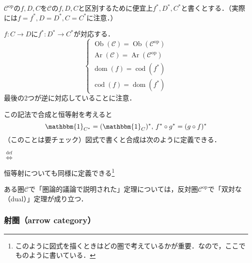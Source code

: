 \documentclass[dvipdfmx,a4j,10pt]{jsarticle}
\theoremstyle{mystyle1}
\theoremstyle{mystyle2}
\newcommand{\defLeftrightarrow}{\overset{\text{def}}{\iff}}
\DeclareMathOperator{\Ob}{Ob}
\DeclareMathOperator{\Ar}{Ar}
\DeclareMathOperator{\dom}{dom}
\DeclareMathOperator{\cod}{cod}
\begin{document}
$\mathcal{C}^{\mathrm{op}}$の$f,D,C$を$\mathcal{C}$の$f,D,C$と区別するために便宜上$f^*,D^*,C^*$と書くとする．（実際には$f=f^*,D=D^*,C=C^*$に注意．）

$f:C\to D$に$f^*:D^* \to C^*$が対応する．
\[
	\begin{cases}
		\Ob(\mathcal{C})  =\Ob(\mathcal{C}^{\mathrm{op}}) \\
		\Ar(\mathcal{C})  =\Ar(\mathcal{C}^{\mathrm{op}}) \\
		\dom(f)           =\cod(f^*)                      \\
		\cod(f)           =\dom(f^*)
	\end{cases}
\]
最後の2つが逆に対応していることに注意．

この記法で合成と恒等射を考えると
\[
	\mathbbm{1}_{C^*}=(\mathbbm{1}_C)^*,\, f^*\circ g^*=(g\circ f)^*
\]
（このことは要チェック）図式で書くと合成は次のように定義できる．
\begin{center}
	$\defLeftrightarrow$
\end{center}
恒等射についても同様に定義できる\footnote{このように図式を描くときはどの圏で考えているかが重要．なので，ここでものように書いている．}

ある圏$\mathcal{C}$で「圏論的議論で説明された」定理については，反対圏$\mathcal{C}^{\mathrm{op}}$で「双対な（dual）」定理が成り立つ．

\subsubsection{射圏（arrow category）}
\end{document}
